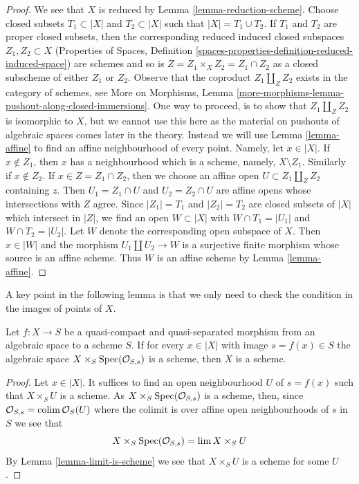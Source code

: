 \begin{proof}
We see that $X$ is reduced by Lemma \ref{lemma-reduction-scheme}.
Choose closed subsets $T_1 \subset |X|$ and $T_2 \subset |X|$ such that
$|X| = T_1 \cup T_2$. If $T_1$ and $T_2$ are proper closed subsets,
then the corresponding reduced induced closed subspaces $Z_1, Z_2 \subset X$
(Properties of Spaces, Definition
\ref{spaces-properties-definition-reduced-induced-space})
are schemes and so is $Z = Z_1 \times_X Z_2 = Z_1 \cap Z_2$ as a closed
subscheme of either $Z_1$ or $Z_2$. Observe that the coproduct
$Z_1 \amalg_Z Z_2$ exists in the category of schemes, see
More on Morphisms, Lemma
\ref{more-morphisms-lemma-pushout-along-closed-immersions}.
One way to proceed, is to show that $Z_1 \amalg_Z Z_2$ is isomorphic to $X$,
but we cannot use this here as the material on pushouts of algebraic
spaces comes later in the theory. Instead we will use
Lemma \ref{lemma-affine} to find an affine neighbourhood of every point.
Namely, let $x \in |X|$. If $x \not \in Z_1$, then $x$ has a neighbourhood
which is a scheme, namely, $X \setminus Z_1$. Similarly if $x \not \in Z_2$.
If $x \in Z = Z_1 \cap Z_2$, then we choose an affine open
$U \subset Z_1 \amalg_Z Z_2$ containing $z$. Then $U_1 = Z_1 \cap U$
and $U_2 = Z_2 \cap U$ are affine opens whose intersections with
$Z$ agree. Since $|Z_1| = T_1$ and $|Z_2| = T_2$ are closed subsets of
$|X|$ which intersect in $|Z|$, we find an open $W \subset |X|$
with $W \cap T_1 = |U_1|$ and $W \cap T_2 = |U_2|$. Let $W$ denote the
corresponding open subspace of $X$. Then $x \in |W|$ and the morphism
$U_1 \amalg U_2 \to W$ is a surjective finite morphism whose source
is an affine scheme. Thus $W$ is an affine scheme by
Lemma \ref{lemma-affine}.
\end{proof}

\noindent
A key point in the following lemma is that we only need to check
the condition in the images of points of $X$.

\begin{lemma}
\label{lemma-enough-local}
Let $f: X \to S$ be a quasi-compact and quasi-separated morphism from an
algebraic space to a scheme $S$. If for every $x \in |X|$ with image
$s = f(x) \in S$ the algebraic space $X \times_S \mathop{\mathrm{Spec}}(\mathcal{O}_{S,s})$
is a scheme, then $X$ is a scheme.
\end{lemma}

\begin{proof}
Let $x \in |X|$. It suffices to find an open neighbourhood $U$ of
$s = f(x)$ such that $X \times_S U$ is a scheme.
As $X \times_S \mathop{\mathrm{Spec}}(\mathcal{O}_{S, s})$ is a scheme, then, since
$\mathcal{O}_{S, s} = \mathop{\mathrm{colim}}\nolimits \mathcal{O}_S(U)$ where the colimit is
over affine open neighbourhoods of $s$ in $S$ we see that
$$
X \times_S \mathop{\mathrm{Spec}}(\mathcal{O}_{S, s}) = \mathop{\mathrm{lim}}\nolimits X \times_S U
$$
By Lemma \ref{lemma-limit-is-scheme} we see that $X \times_S U$
is a scheme for some $U$.
\end{proof}

